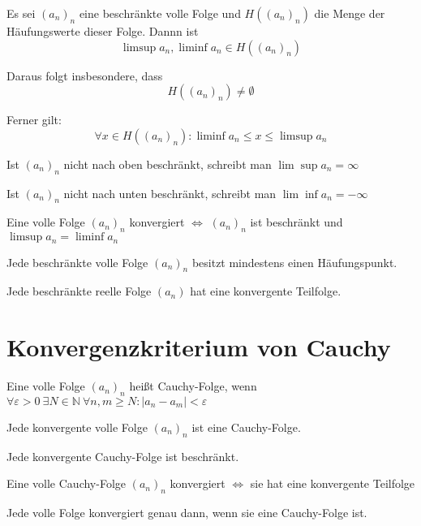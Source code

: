 \begin{lemma}
  Es sei $(a_n)_n$ eine beschränkte volle Folge und $H((a_n)_n)$ die Menge der Häufungswerte dieser Folge. Dannn ist \[ \limsup a_n, \liminf a_n \in H((a_n)_n) \]

  Daraus folgt insbesondere, dass \[ H((a_n)_n) \ne \emptyset \]

  Ferner gilt: \[ \forall x \in H((a_n)_n): \liminf a_n \le x \le \limsup a_n \]
\end{lemma}

\begin{notation}
  Ist $(a_n)_n$ nicht nach oben beschränkt, schreibt man $\lim \sup a_n = \infty$

  Ist $(a_n)_n$ nicht nach unten beschränkt, schreibt man $\lim \inf a_n = -\infty$
\end{notation}

\begin{corollary}
  Eine volle Folge $(a_n)_n$ konvergiert $\iff$ $(a_n)_n$ ist beschränkt und $\limsup a_n = \liminf a_n$
\end{corollary}

\begin{theorem}
  Jede beschränkte volle Folge $(a_n)_n$ besitzt mindestens einen Häufungspunkt.
\end{theorem}

\begin{corollary}
  Jede beschränkte reelle Folge $(a_n)$ hat eine konvergente Teilfolge.
\end{corollary}

\section{Konvergenzkriterium von Cauchy}
\begin{definition}
  Eine volle Folge $(a_n)_n$ heißt Cauchy-Folge, wenn $\forall \varepsilon > 0\: \exists N \in \mathbb{N}\: \forall n,m \ge N: |a_n-a_m| < \varepsilon$
\end{definition}
\begin{lemma}
  Jede konvergente volle Folge $(a_n)_n$ ist eine Cauchy-Folge.
\end{lemma}
\begin{lemma}
  Jede konvergente Cauchy-Folge ist beschränkt.
\end{lemma}

\begin{lemma}
  Eine volle Cauchy-Folge $(a_n)_n$ konvergiert $\iff$ sie hat eine konvergente Teilfolge
\end{lemma}

\begin{theorem}
  Jede volle Folge konvergiert genau dann, wenn sie eine Cauchy-Folge ist.
\end{theorem}